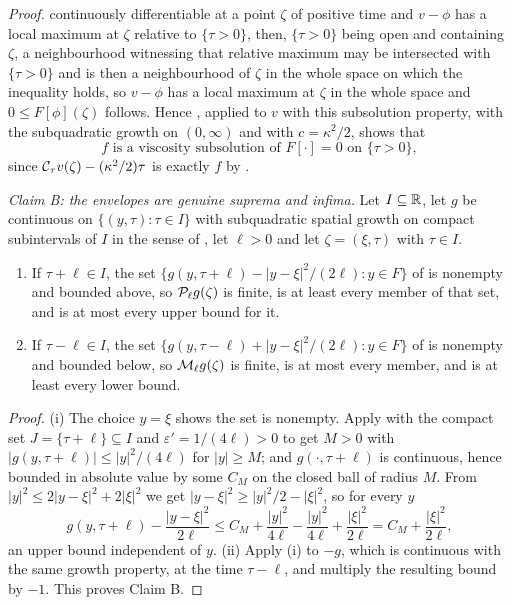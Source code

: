 \begin{proof}
continuously differentiable at a point $\zeta$ of positive time and $v-\phi$ has
a local maximum at $\zeta$ relative to $\{\tau>0\}$, then, $\{\tau>0\}$ being
open and containing $\zeta$, a neighbourhood witnessing that relative maximum
may be intersected with $\{\tau>0\}$ and is then a neighbourhood of $\zeta$ in
the whole space on which the inequality holds, so $v-\phi$ has a local maximum
at $\zeta$ in the whole space and $0\le F[\phi](\zeta)$ follows. Hence
, applied to $v$ with this subsolution
property, with the subquadratic growth on $(0,\infty)$ and with
$c=\kappa^2/2$, shows that
\begin{equation}\label{eq:dpd-fsub}
  f\text{ is a viscosity subsolution of }F[\cdot]=0\text{ on }\{\tau>0\},
\end{equation}
since $\mathcal{C}_\tau v(\zeta)-(\kappa^2/2)\tau$ is exactly $f$ by
.

\emph{Claim B: the envelopes are genuine suprema and infima.}
Let $I\subseteq\mathbb{R}$, let $g$ be continuous on $\{(y,\tau):\tau\in I\}$ with
subquadratic spatial growth on compact subintervals of $I$ in the sense of
, let $\ell>0$ and let $\zeta=(\xi,\tau)$ with
$\tau\in I$.
\begin{enumerate}
\item[(i)] If $\tau+\ell\in I$, the set
$\{g(y,\tau+\ell)-|y-\xi|^2/(2\ell):y\in F\}$ of  is nonempty
and bounded above, so $\mathcal{P}_\ell g(\zeta)$ is finite, is at least every member
of that set, and is at most every upper bound for it.
\item[(ii)] If $\tau-\ell\in I$, the set
$\{g(y,\tau-\ell)+|y-\xi|^2/(2\ell):y\in F\}$ of  is nonempty
and bounded below, so $\mathcal{M}_\ell g(\zeta)$ is finite, is at most every member,
and is at least every lower bound.
\end{enumerate}
\emph{Proof.} (i) The choice $y=\xi$ shows the set is nonempty. Apply
 with the compact set $J=\{\tau+\ell\}\subseteq I$
and $\varepsilon'=1/(4\ell)>0$ to get $M>0$ with
$|g(y,\tau+\ell)|\le|y|^2/(4\ell)$ for $|y|\ge M$; and $g(\cdot,\tau+\ell)$ is
continuous, hence bounded in absolute value by some $C_M$ on the closed ball of
radius $M$. From $|y|^2\le2|y-\xi|^2+2|\xi|^2$ we get
$|y-\xi|^2\ge|y|^2/2-|\xi|^2$, so for every $y$
\[
  g(y,\tau+\ell)-\frac{|y-\xi|^2}{2\ell}
   \le C_M+\frac{|y|^2}{4\ell}-\frac{|y|^2}{4\ell}+\frac{|\xi|^2}{2\ell}
   =C_M+\frac{|\xi|^2}{2\ell},
\]
an upper bound independent of $y$. (ii) Apply (i) to $-g$, which is continuous
with the same growth property, at the time $\tau-\ell$, and multiply the
resulting bound by $-1$. This proves Claim B.


\end{proof}
